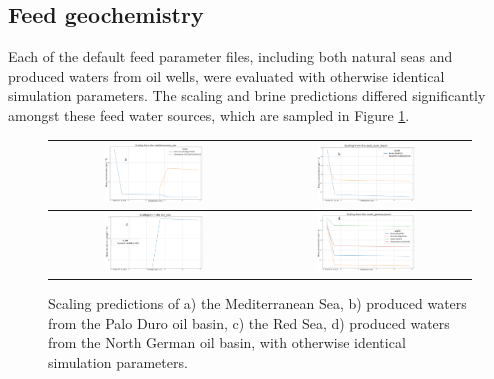 \subsection{Feed geochemistry}
Each of the default feed parameter files, including both natural seas and produced waters from oil wells, were evaluated with otherwise identical simulation parameters. The scaling and brine predictions differed significantly amongst these feed water sources, which are sampled in Figure \ref{feed_sources}.  

\begin{figure}[h]
    \centering
    \begin{tabular}{c|c}
        \includegraphics[width=0.49\textwidth]{images/ROSSpy/sensitivity_analyses/feed_source/Mediterranean.png} &
        \includegraphics[width=0.49\textwidth]{images/ROSSpy/sensitivity_analyses/feed_source/Palo_Duro_basin.png} \\ \midrule
        \includegraphics[width=0.49\textwidth]{images/ROSSpy/sensitivity_analyses/feed_source/Red_Sea.png} & \includegraphics[width=0.49\textwidth]{images/ROSSpy/sensitivity_analyses/feed_source/German_Basin.png} \\ \bottomrule
    \end{tabular}
    \caption{
        Scaling predictions of a) the Mediterranean Sea, b) produced waters from the Palo Duro oil basin, c) the Red Sea, d) produced waters from the North German oil basin, with otherwise identical simulation parameters.
    }
    \label{feed_sources}
\end{figure}


